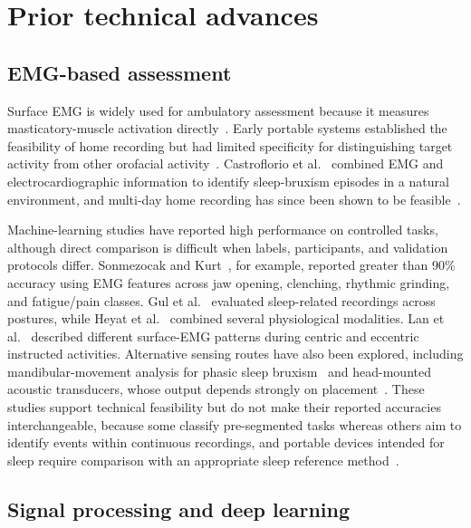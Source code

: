 \documentclass[pdflatex,sn-nature,iicol]{sn-jnl}
\begin{document}
\section{Prior technical advances}

\subsection{EMG-based assessment}

Surface EMG is widely used for ambulatory assessment because it measures masticatory-muscle activation directly~\cite{raez2006techniques}. Early portable systems established the feasibility of home recording but had limited specificity for distinguishing target activity from other orofacial activity~\cite{stuginski2016detection}. Castroflorio et al.~\cite{castroflorio2013use} combined EMG and electrocardiographic information to identify sleep-bruxism episodes in a natural environment, and multi-day home recording has since been shown to be feasible~\cite{colonna2023electromyographic}.

Machine-learning studies have reported high performance on controlled tasks, although direct comparison is difficult when labels, participants, and validation protocols differ. Sonmezocak and Kurt~\cite{sonmezocak2021detection}, for example, reported greater than 90\% accuracy using EMG features across jaw opening, clenching, rhythmic grinding, and fatigue/pain classes. Gul et al.~\cite{gul2024advanced} evaluated sleep-related recordings across postures, while Heyat et al.~\cite{heyat2020computational} combined several physiological modalities. Lan et al.~\cite{lan2022comparative} described different surface-EMG patterns during centric and eccentric instructed activities. Alternative sensing routes have also been explored, including mandibular-movement analysis for phasic sleep bruxism~\cite{martinot2021artificial} and head-mounted acoustic transducers, whose output depends strongly on placement~\cite{romano2024wearable}. These studies support technical feasibility but do not make their reported accuracies interchangeable, because some classify pre-segmented tasks whereas others aim to identify events within continuous recordings, and portable devices intended for sleep require comparison with an appropriate sleep reference method~\cite{cidverdejo2024instrumental}.

\subsection{Signal processing and deep learning}
\end{document}
